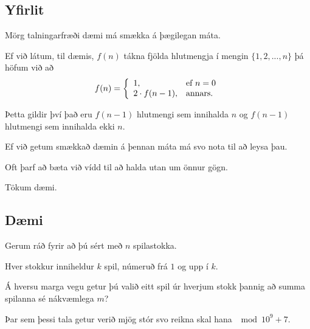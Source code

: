 \subsection{Yfirlit}
{
    {
        \item<1-> Mörg talningarfræði dæmi má smækka á þægilegan máta.
        \item<2-> Ef við látum, til dæmis, $f(n)$ tákna fjölda hlutmengja í mengin $\{1, 2, ..., n\}$ þá höfum við að
        \[
            f(n) = \left \{
            \env{array}
            { {l l}
                1, & \text{ef $n = 0$}\\
                2 \cdot f(n - 1), & \text{annars}.
            }
            \right .
        \]
        \item<3-> Þetta gildir því það eru $f(n - 1)$ hlutmengi sem innihalda $n$ og $f(n - 1)$ hlutmengi sem innihalda ekki $n$.
        \item<4-> Ef við getum smækkað dæmin á þennan máta má svo nota  til að leysa þau.
        \item<6-> Oft þarf að bæta við vídd til að halda utan um önnur gögn.
        \item<7-> Tökum dæmi.
    }
}

\subsection{Dæmi}
{
    {
        \item<1-> Gerum ráð fyrir að þú sért með $n$ spilastokka.
        \item<2-> Hver stokkur inniheldur $k$ spil, númeruð frá $1$ og upp í $k$.
        \item<3-> Á hversu marga vegu getur þú valið eitt spil úr hverjum stokk þannig að summa spilanna sé nákvæmlega $m$?
        \item<4-> Þar sem þessi tala getur verið mjög stór svo reikna skal hana $\mod 10^9 + 7$.
    }
}

